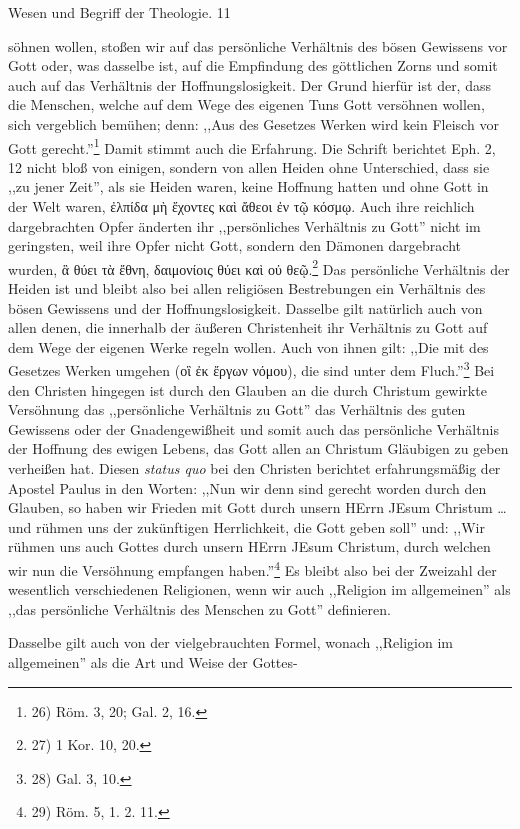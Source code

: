 Wesen und Begriff der Theologie. \hfill 11

söhnen wollen, stoßen wir auf das persönliche Verhältnis des bösen Gewissens vor Gott oder, was dasselbe ist, auf die Empfindung des göttlichen Zorns und somit auch auf das Verhältnis der Hoffnungslosigkeit. Der Grund hierfür ist der, dass die Menschen, welche auf dem Wege des eigenen Tuns Gott versöhnen wollen, sich vergeblich bemühen; denn: ,,Aus des Gesetzes Werken wird kein Fleisch vor Gott gerecht.''\footnote{26) Röm. 3, 20; Gal. 2, 16.} Damit stimmt auch die Erfahrung. Die Schrift berichtet Eph. 2, 12 nicht bloß von einigen, sondern von allen Heiden ohne Unterschied, dass sie ,,zu jener Zeit'', als sie Heiden waren, keine Hoffnung hatten und ohne Gott in der Welt waren, ἐλπίδα μὴ ἔχοντες καὶ ἄθεοι ἐν τῷ κόσμῳ. Auch ihre reichlich dargebrachten Opfer änderten ihr ,,persönliches Verhältnis zu Gott'' nicht im geringsten, weil ihre Opfer nicht Gott, sondern den Dämonen dargebracht wurden, ἃ θύει τὰ ἔθνη, δαιμονίοις θύει καὶ οὐ θεῷ.\footnote{27) 1 Kor. 10, 20.} Das persönliche Verhältnis der Heiden ist und bleibt also bei allen religiösen Bestrebungen ein Verhältnis des bösen Gewissens und der Hoffnungslosigkeit. Dasselbe gilt natürlich auch von allen denen, die innerhalb der äußeren Christenheit ihr Verhältnis zu Gott auf dem Wege der eigenen Werke regeln wollen. Auch von ihnen gilt: ,,Die mit des Gesetzes Werken umgehen (οἳ ἐκ ἔργων νόμου), die sind unter dem Fluch.''\footnote{28) Gal. 3, 10.} Bei den Christen hingegen ist durch den Glauben an die durch Christum gewirkte Versöhnung das ,,persönliche Verhältnis zu Gott'' das Verhältnis des guten Gewissens oder der Gnadengewißheit und somit auch das persönliche Verhältnis der Hoffnung des ewigen Lebens, das Gott allen an Christum Gläubigen zu geben verheißen hat. Diesen \emph{status quo} bei den Christen berichtet erfahrungsmäßig der Apostel Paulus in den Worten: ,,Nun wir denn sind gerecht worden durch den Glauben, so haben wir Frieden mit Gott durch unsern HErrn JEsum Christum \ldots und rühmen uns der zukünftigen Herrlichkeit, die Gott geben soll'' und: ,,Wir rühmen uns auch Gottes durch unsern HErrn JEsum Christum, durch welchen wir nun die Versöhnung empfangen haben.''\footnote{29) Röm. 5, 1. 2. 11.} Es bleibt also bei der Zweizahl der wesentlich verschiedenen Religionen, wenn wir auch ,,Religion im allgemeinen'' als ,,das persönliche Verhältnis des Menschen zu Gott'' definieren.

Dasselbe gilt auch von der vielgebrauchten Formel, wonach ,,Religion im allgemeinen'' als die Art und Weise der Gottes-